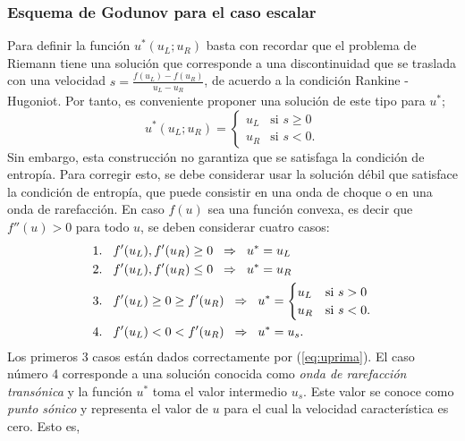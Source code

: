 \subsubsection{Esquema de Godunov para el caso escalar}
Para definir la función $u^{*}(u_L; u_R)$ basta con recordar que el problema de Riemann tiene una solución que corresponde a una discontinuidad que se traslada con una velocidad $s=\frac{f(u_L)-f(u_R)}{u_L - u_R}$, de acuerdo a la condición Rankine - Hugoniot. Por tanto, es conveniente proponer una solución de este tipo para $u^{*}$; 
\begin{equation}
	u^{*}(u_L; u_R) = 
	\begin{cases}
		u_L & \text{si } s \geq 0\\
		u_R & \text{si } s < 0.
	\end{cases}
\label{eq:uprima}
\end{equation}
Sin embargo, esta construcción no garantiza que se satisfaga la condición de entropía. Para corregir esto, se debe considerar usar la solución débil que satisface la condición de entropía, que puede consistir en una onda de choque o en una onda de rarefacción. En caso $f(u)$ sea una función convexa, es decir que $f''(u)>0$ para todo $u$, se deben considerar cuatro casos:
\begin{align}
	1.\hspace{3mm}&f'(u_L),f'(u_R) \geq 0 \hspace{2mm} \Rightarrow \hspace{2mm} u^{*} = u_L \\
	2.\hspace{3mm}&f'(u_L),f'(u_R) \leq 0 \hspace{2mm} \Rightarrow \hspace{2mm} u^{*} = u_R \\
	3.\hspace{3mm}&f'(u_L) \geq 0 \geq f'(u_R) \hspace{2mm} \Rightarrow  \hspace{2mm} u^{*} = 
	\begin{cases}
		u_L & \text{si } s > 0\\
		u_R & \text{si } s < 0.
	\end{cases} \\
	4. \hspace{3mm}&f'(u_L) < 0 < f'(u_R) \hspace{2mm} \Rightarrow  \hspace{2mm} u^{*} = u_{s}.
	\label{eq:4-godunov}
\end{align}
Los primeros 3 casos están dados correctamente por (\ref{eq:uprima}). El caso número 4 corresponde a una solución conocida como  \textit{onda de rarefacción transónica} y la función $u^{*}$ toma el valor intermedio $u_s$. Este valor se conoce como \textit{punto sónico} y representa el valor de $u$ para el cual la velocidad característica es cero. Esto es,
